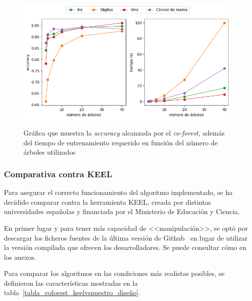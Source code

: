\begin{itemize}
	\begin{figure}[h]
		\caption[\textit{Co-Forest}: resultados experimentación (número de árboles)]{Gráfica que muestra la \textit{accuracy} alcanzada por el \textit{co-forest}, además del tiempo de entrenamiento requerido en función del número de árboles utilizados}
		\centering
		\includegraphics[scale=0.7]{../img/memoria/5_coforest_trees}
		\label{cf:tt_trees}
	\end{figure}
	
\end{itemize} 


\subsubsection{Comparativa contra KEEL}

Para asegurar el correcto funcionamiento del algoritmo implementado, se ha decidido comparar contra la herramienta KEEL, creada por distintas universidades españolas y financiada por el Ministerio de Educación y Ciencia.

En primer lugar y para tener más capacidad de <<manipulación>>, se optó por descargar los ficheros fuentes de la última versión de Github~\cite{keelRepo} en lugar de utilizar la versión compilada que ofrecen los desarrolladores. Se puede consultar cómo en los anexos.

Para comparar los algoritmos en las condiciones más realistas posibles, se definieron las características mostradas en la tabla~\ref{tabla_coforest_keelvsnuestro_diseño}.

